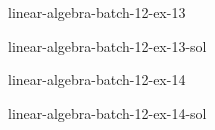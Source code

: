 \documentclass[preview]{standalone}
\begin{document}
\begin{snippetexercise}{linear-algebra-batch-12-ex-13}{}
    \todo
\end{snippetexercise}

\begin{snippetsolution}{linear-algebra-batch-12-ex-13-sol}{}
    \todo
\end{snippetsolution}

\begin{snippetexercise}{linear-algebra-batch-12-ex-14}{}
    \todo
\end{snippetexercise}

\begin{snippetsolution}{linear-algebra-batch-12-ex-14-sol}{}
    \todo
\end{snippetsolution}
\end{document}
